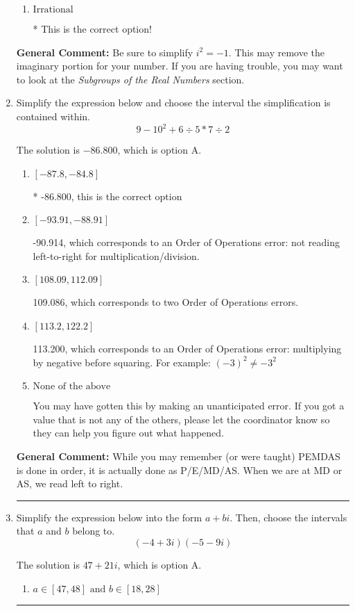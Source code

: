 \documentclass{extbook}[14pt]
\newcommand{\litem}[1]{\item #1

\rule{\textwidth}{0.4pt}}
\begin{document}
\begin{enumerate}
{\begin{enumerate}[label=\Alph*.]
This is a Complex number $(a+bi)$ that \textbf{only} has an imaginary part like $2i$.
\item \( \text{Irrational} \)

* This is the correct option!
\end{enumerate}

\textbf{General Comment:} Be sure to simplify $i^2 = -1$. This may remove the imaginary portion for your number. If you are having trouble, you may want to look at the \textit{Subgroups of the Real Numbers} section.
}
\litem{
Simplify the expression below and choose the interval the simplification is contained within.
\[ 9 - 10^2 + 6 \div 5 * 7 \div 2 \]

The solution is \( -86.800 \), which is option A.\begin{enumerate}[label=\Alph*.]
\item \( [-87.8, -84.8] \)

* -86.800, this is the correct option
\item \( [-93.91, -88.91] \)

 -90.914, which corresponds to an Order of Operations error: not reading left-to-right for multiplication/division.
\item \( [108.09, 112.09] \)

 109.086, which corresponds to two Order of Operations errors.
\item \( [113.2, 122.2] \)

 113.200, which corresponds to an Order of Operations error: multiplying by negative before squaring. For example: $(-3)^2 \neq -3^2$
\item \( \text{None of the above} \)

 You may have gotten this by making an unanticipated error. If you got a value that is not any of the others, please let the coordinator know so they can help you figure out what happened.
\end{enumerate}

\textbf{General Comment:} While you may remember (or were taught) PEMDAS is done in order, it is actually done as P/E/MD/AS. When we are at MD or AS, we read left to right.
}
\litem{
Simplify the expression below into the form $a+bi$. Then, choose the intervals that $a$ and $b$ belong to.
\[ (-4 + 3 i)(-5 - 9 i) \]

The solution is \( 47 + 21 i \), which is option A.\begin{enumerate}[label=\Alph*.]
\item \( a \in [47, 48] \text{ and } b \in [18, 28] \)


\end{enumerate}}
\end{enumerate}
\end{document}
